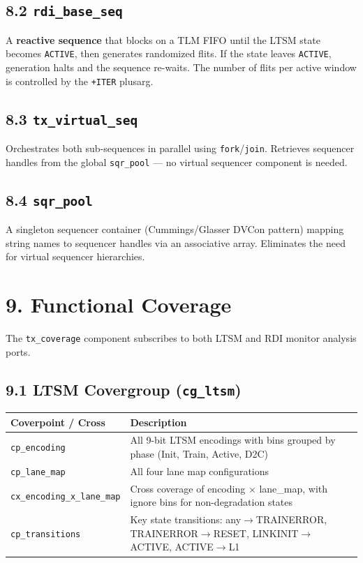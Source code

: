 \documentclass[11pt,a4paper]{article}
\begin{document}
\subsection{8.2 \texttt{rdi\_base\_seq}}

A \textbf{reactive sequence} that blocks on a TLM FIFO until the LTSM state becomes \texttt{ACTIVE}, then generates randomized flits. If the state leaves \texttt{ACTIVE}, generation halts and the sequence re-waits. The number of flits per active window is controlled by the \texttt{+ITER} plusarg.

\subsection{8.3 \texttt{tx\_virtual\_seq}}

Orchestrates both sub-sequences in parallel using \texttt{fork}/\texttt{join}. Retrieves sequencer handles from the global \texttt{sqr\_pool} --- no virtual sequencer component is needed.

\subsection{8.4 \texttt{sqr\_pool}}

A singleton sequencer container (Cummings/Glasser DVCon pattern) mapping string names to sequencer handles via an associative array. Eliminates the need for virtual sequencer hierarchies.


\section{9. Functional Coverage}

The \texttt{tx\_coverage} component subscribes to both LTSM and RDI monitor analysis ports.

\subsection{9.1 LTSM Covergroup (\texttt{cg\_ltsm})}


\begin{tabularx}{\textwidth}{|X|X|}
\hline
\textbf{Coverpoint / Cross} & \textbf{Description} \\
\hline
\texttt{cp\_encoding} & All 9-bit LTSM encodings with bins grouped by phase (Init, Train, Active, D2C) \\
\hline
\texttt{cp\_lane\_map} & All four lane map configurations \\
\hline
\texttt{cx\_encoding\_x\_lane\_map} & Cross coverage of encoding $\times$ lane\_map, with ignore bins for non-degradation states \\
\hline
\texttt{cp\_transitions} & Key state transitions: any$\rightarrow$TRAINERROR, TRAINERROR$\rightarrow$RESET, LINKINIT$\rightarrow$ACTIVE, ACTIVE$\rightarrow$L1 \\
\hline
\end{tabularx}
\end{document}

